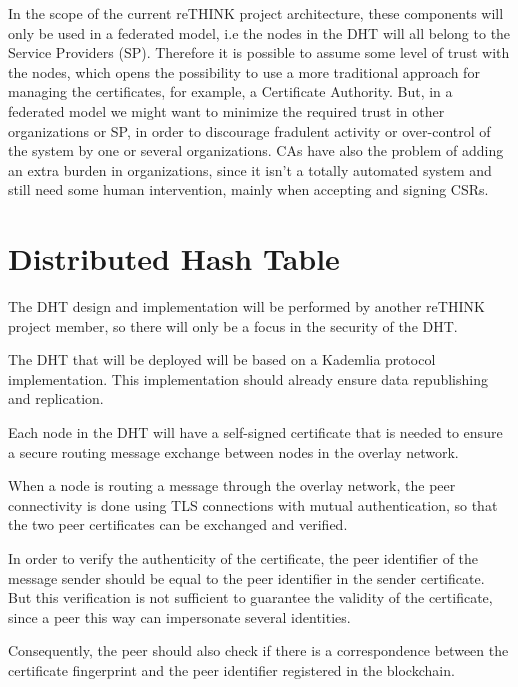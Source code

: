 In the scope of the current reTHINK project architecture, these components will only be used in a federated model, i.e the nodes in the \ac{DHT} will all belong to the Service Providers (SP).
Therefore it is possible to assume some level of trust with the nodes, which opens the possibility to use a more traditional approach for managing the certificates, for example, a Certificate Authority.
But, in a federated model we might want to minimize the required trust in other organizations or SP, in order to discourage fradulent activity or over-control of the system by one or several organizations.
\acp{CA} have also the problem of adding an extra burden in organizations, since it isn't a totally automated system and still need some human intervention, mainly when accepting and signing \acp{CSR}.

\section{Distributed Hash Table}\label{ssec:dht}

The DHT design and implementation will be performed by another reTHINK project member, so there will only be a focus in the security of the DHT.

The DHT that will be deployed will be based on a Kademlia protocol implementation.
This implementation should already ensure data republishing and replication.

Each node in the DHT will have a self-signed certificate that is needed to ensure a secure routing message exchange between nodes in the overlay network.

When a node is routing a message through the overlay network, the peer connectivity is done using TLS connections with mutual authentication, so that the two peer certificates can be exchanged and verified.

In order to verify the authenticity of the certificate, the peer identifier of the message sender should be equal to the peer identifier in the sender certificate.
But this verification is not sufficient to guarantee the validity of the certificate, since a peer this way can impersonate several identities.

Consequently, the peer should also check if there is a correspondence between the certificate fingerprint and the peer identifier registered in the blockchain.


